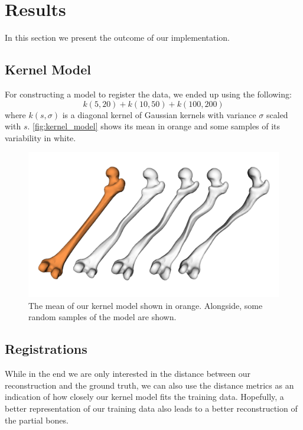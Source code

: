 \section{Results}
\label{sec:results}

In this section we present the outcome of our implementation.


\subsection{Kernel Model}
\label{subsec:kernmodel}

For constructing a model to register the data, we ended up using the following: 
$$ k(5, 20) + k(10, 50) + k(100, 200) $$
where $k(s, \sigma)$ is a diagonal kernel of Gaussian kernels with variance $\sigma$ scaled with $s$. 
\autoref{fig:kernel_model} shows its mean in orange and some samples of its variability in white.

\begin{figure}
	\centering
  \includegraphics[width=\columnwidth]{./Figures/kernel_model_samples}
  \caption{
    The mean of our kernel model shown in orange. 
    Alongside, some random samples of the model are shown.}
  \label{fig:kernel_model}
\end{figure}


\subsection{Registrations}
\label{subsec:registrresults}
While in the end we are only interested in the distance between our reconstruction and the ground truth, we can also use the distance metrics as an indication of how closely our kernel model fits the training data. 
Hopefully, a better representation of our training data also leads to a better reconstruction of the partial bones. 


